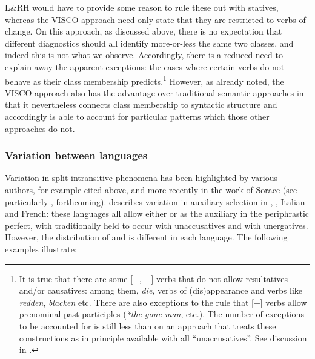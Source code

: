 \documentclass[output=paper]{langsci/langscibook}
\begin{document}
\ea
    \z
\z
L\&RH would have to provide some reason to rule these out with statives,
whereas the VISCO approach need only state that they are restricted to verbs of
change. On this approach, as discussed above, there is no expectation that
different  diagnostics should all identify more-or-less the
same two classes, and indeed this is not what we observe. Accordingly, there is
a reduced need to explain away the apparent exceptions: the cases where certain
verbs do not behave as their class membership predicts.\footnote{It is true
that there are some [$+$\Change{}, $-$\Initiation{}] verbs that do not allow
resultatives and/or causatives: among them, \emph{die}, verbs of
(dis)appearance and verbs like \emph{redden}, \emph{blacken} etc. There are
also exceptions to the rule that [$+$\Change{}] verbs allow prenominal past
participles (\emph{*the gone man}, etc.). The number of exceptions to be
accounted for is still less than on an approach that treats these constructions
as in principle available with all \enquote{unaccusatives}. See discussion in
\textcite{Baker2018,Baker2019}.}  However, as already noted, the VISCO approach also
has the advantage over traditional semantic approaches in that it nevertheless
connects class membership to syntactic structure and accordingly is able to
account for particular patterns which those other approaches do not.

\subsubsection{Variation between languages}\label{sec:baker:3.4.6}

Variation in split intransitive phenomena has been highlighted by various
authors, for example \citet{Rosen1984} cited above, and more recently in the
work of Sorace (see particularly \citealt{Sorace2000}, forthcoming).
\citet{Sorace2000} describes variation in auxiliary selection in , ,
Italian and French: these languages all allow either \BE{} or \HAVE{} as the
auxiliary in the periphrastic perfect, with \BE{} traditionally held to occur with
unaccusatives and \HAVE{} with unergatives. However, the distribution of \BE{} and
\HAVE{} is different in each language. The following examples illustrate:
\end{document}
